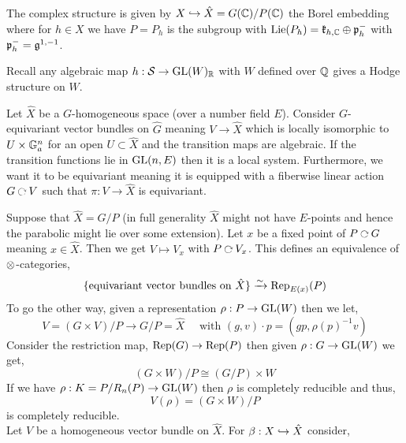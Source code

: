 \documentclass[12pt]{article}
\newcommand{\bs}{\backslash}
\begin{document}
The complex structure is given by $X \hookrightarrow \hat{X} = G(\mathbb{C}) / P(\mathbb{C})$ the Borel embedding where for $h \in X$ we have $P = P_h$ is the subgroup with $\mathrm{Lie}(P_h) = \mathfrak{k}_{h, \mathbb{C}} \oplus \mathfrak{p}_h^{-}$ with $\mathfrak{p}_h^{-} = \mathfrak{g}^{1,-1}$. 

\begin{rmk}
Recall any algebraic map $h : \mathcal{S} \to \mathrm{GL}(W)_{\mathbb{R}}$ with $W$ defined over $\mathbb{Q}$ gives a Hodge structure on $W$. 
\end{rmk}

Let $\hat{X}$ be a $G$-homogeneous space (over a number field $E$). Consider $G$-equivariant vector bundles on $\hat{G}$ meaning $V \to \hat{X}$ which is locally isomorphic to $U \times \mathbb{G}_a^n$ for an open $U \subset \hat{X}$ and the transition maps are algebraic. If the transition functions lie in $\mathrm{GL}(n, E)$ then it is a local system. Furthermore, we want it to be equivariant meaning it is equipped with a fiberwise linear action $G \acts V$ such that $\pi : V \to \hat{X}$ is equivariant. 

\begin{center}
\end{center}

Suppose that $\hat{X} = G / P$ (in full generality $\hat{X}$ might not have $E$-points and hence the parabolic might lie over some extension).
Let $x$ be a fixed point of $P \acts G$ meaning $x \in \hat{X}$. Then we get $V \mapsto V_x$ with $P \acts V_x$. This defines an equivalence of $\otimes$-categories,
\[ \{ \text{equivariant vector bundles on } \hat{X} \} \xrightarrow{\sim} \mathrm{Rep}_{E(x)}(P) \]
To go the other way, given a representation $\rho : P \to \mathrm{GL}(W)$ then we let,
\[ V = (G \times V) / P \to G / P = \hat{X} \quad \text{ with } (g, v) \cdot p = (gp, \rho(p)^{-1} v) \]
Consider the restriction map, $\mathrm{Rep}(G) \to \mathrm{Rep}(P)$ then given $\rho : G \to \mathrm{GL}(W)$ we get,
\[ (G \times W) / P \cong (G/P) \times W \]
If we have $\rho  : K = P / R_n(P) \to \mathrm{GL}(W)$ then $\rho$ is completely reducible and thus,
\[ V(\rho) = (G \times W)/P \]
is completely reducible. 
\bigskip\\
Let $V$ be a homogeneous vector bundle on $\hat{X}$. For $\beta : X \hookrightarrow \hat{X}$ consider,
\begin{center}
\end{center}
\end{document}
